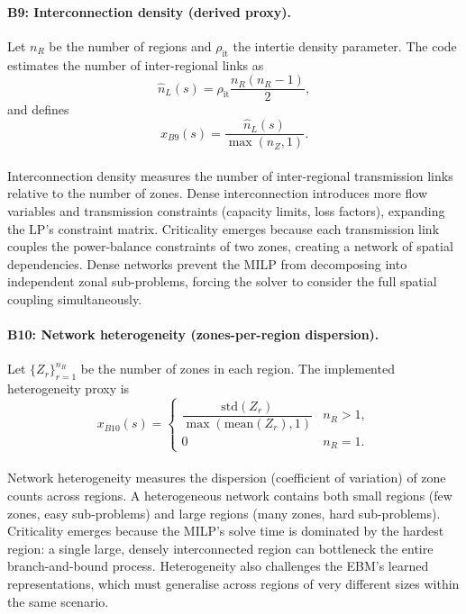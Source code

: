 \documentclass{article}
\begin{document}
\paragraph{B9: Interconnection density (derived proxy).}
Let $n_R$ be the number of regions and $\rho_{\mathrm{it}}$ the intertie density parameter. The code estimates the number of inter-regional links as
\begin{equation}
\widehat{n}_L(s)=\rho_{\mathrm{it}}\frac{n_R(n_R-1)}{2},
\end{equation}
and defines
\begin{equation}
x_{B9}(s)=\frac{\widehat{n}_L(s)}{\max(n_Z,1)}.
\end{equation}

\paragraph{}Interconnection density measures the number of inter-regional transmission links relative to the number of zones. Dense interconnection introduces more flow variables and transmission constraints (capacity limits, loss factors), expanding the LP's constraint matrix. Criticality emerges because each transmission link couples the power-balance constraints of two zones, creating a network of spatial dependencies. Dense networks prevent the MILP from decomposing into independent zonal sub-problems, forcing the solver to consider the full spatial coupling simultaneously.

\paragraph{B10: Network heterogeneity (zones-per-region dispersion).}
Let $\{Z_r\}_{r=1}^{n_R}$ be the number of zones in each region. The implemented heterogeneity proxy is
\begin{equation}
x_{B10}(s)=
\begin{cases}
\dfrac{\mathrm{std}(Z_r)}{\max(\mathrm{mean}(Z_r),1)} & n_R>1,\\[4pt]
0 & n_R=1.
\end{cases}
\end{equation}

\paragraph{}Network heterogeneity measures the dispersion (coefficient of variation) of zone counts across regions. A heterogeneous network contains both small regions (few zones, easy sub-problems) and large regions (many zones, hard sub-problems). Criticality emerges because the MILP's solve time is dominated by the hardest region: a single large, densely interconnected region can bottleneck the entire branch-and-bound process. Heterogeneity also challenges the EBM's learned representations, which must generalise across regions of very different sizes within the same scenario.
\end{document}
